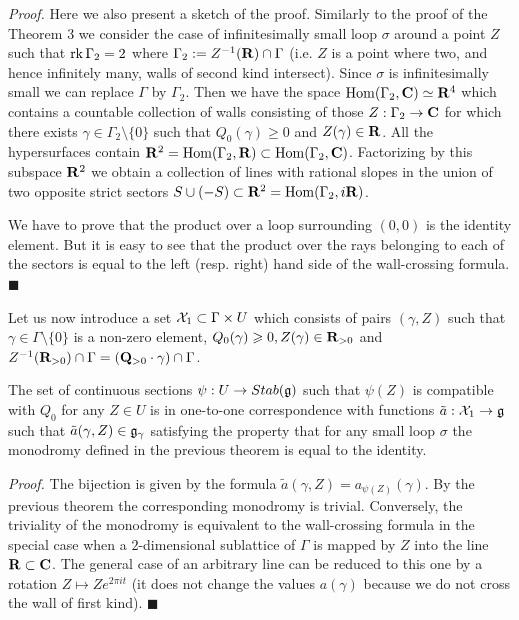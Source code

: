 \documentclass[12pt]{article}
\begin{document}
{\it Proof.} Here we also present a sketch of the proof. Similarly to the proof of the Theorem 3 we consider the case of infinitesimally small loop $\sigma$
around a point $Z$ such that $\operatorname{rk} \Gamma_2=2$ where $\Gamma_2:=Z^{-1}({\bf R})\cap \Gamma$ (i.e. $Z$ is a point where two, and hence infinitely many, walls of second kind intersect). Since $\sigma$ is infinitesimally small we can replace $\Gamma$ by $\Gamma_2$. Then we have the space $\operatorname{Hom}(\Gamma_2,{\bf C})\simeq {\bf R}^4$ which contains a countable collection of walls consisting of those $Z: \Gamma_2\to {\bf C}$ for which there exists $\gamma\in \Gamma_2\setminus \{0\}$ such that $Q_0(\gamma)\geqslant 0$ and $Z(\gamma)\in {\bf R}$. All the hypersurfaces contain ${\bf R}^2= \operatorname{Hom}(\Gamma_2,{\bf R})\subset \operatorname{Hom}(\Gamma_2,{\bf C})$. Factorizing by this subspace ${\bf R}^2$ we obtain a collection of lines with rational slopes in the union of two opposite strict sectors  $S\cup (-S)\subset {\bf R}^2=\operatorname{Hom}(\Gamma_2,i{\bf R})$.






We have to prove that the product over a loop surrounding $(0,0)$ is the identity element. But it is easy to see that the product over the rays belonging to each of the sectors is equal to the left (resp. right) hand side of the wall-crossing formula. $\blacksquare$

Let us now introduce a set
${\cal X}_1\subset \Gamma\times U$ which consists of pairs $(\gamma,Z)$ such that $\gamma\in\Gamma\setminus\{0\}$ is a non-zero  element, $Q_0(\gamma)\geqslant 0, Z(\gamma)\in {\bf R}_{>0}$ and $Z^{-1}({\bf R}_{>0})\cap \Gamma=({\bf Q}_{>0}\cdot \gamma)\cap \Gamma$.

\begin{prp} The set of continuous sections $\psi: U\to Stab({\mathfrak g})$ such that $\psi(Z)$ is compatible with $Q_0$ for any $Z\in U$ is in one-to-one correspondence with functions
$\tilde{a}: {\cal X}_1\to {\mathfrak g}$ such that $\tilde{a}(\gamma,Z)\in {\mathfrak g}_{\gamma}$ satisfying the property that for any small loop $\sigma$ the monodromy defined in the previous theorem is equal to the identity.


\end{prp}

{\it Proof.} The bijection is given by the formula $\tilde{a}(\gamma, Z)=a_{\psi(Z)}(\gamma)$. By the previous theorem the corresponding monodromy is trivial. Conversely, the triviality of the monodromy is equivalent to the wall-crossing formula in the special case when a $2$-dimensional sublattice of $\Gamma$ is mapped by $Z$ into the line ${\bf R}\subset {\bf C}$. The general case of an arbitrary line can be reduced to this one by a rotation $Z\mapsto Ze^{2\pi it}$ (it does not change the values $a(\gamma)$ because we do not cross the wall of first kind). $\blacksquare$
\end{document}
